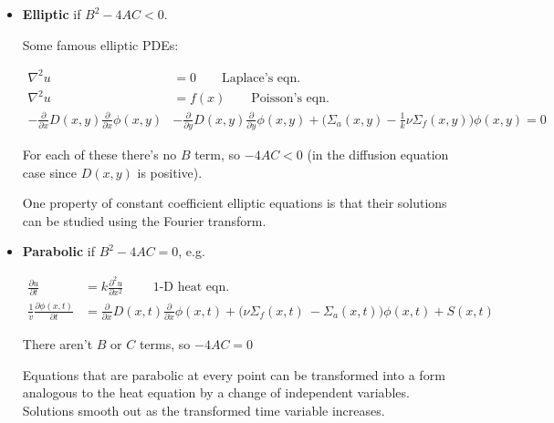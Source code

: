 \documentclass[12pt]{article}
\newcommand{\Macro}{\ensuremath{\Sigma}}
\begin{document}
\begin{itemize}
\item \textbf{Elliptic} if $B^2 - 4 AC < 0$.

Some famous elliptic PDEs:

\begin{align*}
\nabla^2 u &= 0 \qquad \text{Laplace's eqn.} \nonumber \\
\nabla^2 u &= f(x) \qquad \text{Poisson's eqn.} \nonumber \\
-\frac{\partial}{\partial x}D(x,y)\frac{\partial}{\partial x}\phi(x,y) &-
\frac{\partial}{\partial y}D(x,y)\frac{\partial}{\partial y}\phi(x,y) +
\bigl(\Macro_a(x,y) - \frac{1}{k} \nu \Macro_f(x,y)\bigr) \phi(x,y) =0\nonumber
\end{align*}

For each of these there's no $B$ term, so $-4AC < 0$ (in the diffusion 
equation case since $D(x,y)$ is positive).

One property of constant coefficient elliptic equations is that their 
solutions can be studied using the Fourier transform. %

\item \textbf{Parabolic} if $B^2 - 4 AC = 0$, e.g.

\begin{align}
\frac{\partial u}{\partial t} &=
k \frac{\partial^2 u}{\partial x^2} \qquad \text{ 1-D heat eqn.} \nonumber \\
\frac{1}{v}\frac{\partial \phi(x,t)}{\partial t} &=
\frac{\partial}{\partial x}D(x,t)\frac{\partial}{\partial x}\phi(x,t) +
\bigl(\nu \Macro_f(x,t)\ - \Macro_a(x,t)\bigr) \phi(x,t) + S(x,t)\nonumber
\end{align}

There aren't $B$ or $C$ terms, so $-4AC = 0$

Equations that are parabolic at every point can be transformed into a form 
analogous to the heat equation by a change of independent variables. Solutions 
smooth out as the transformed time variable increases.


\end{itemize}
\end{document}
